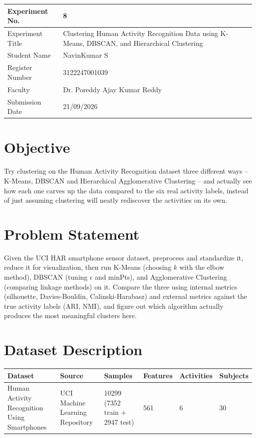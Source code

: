 \documentclass[12pt,a4paper]{article}
\begin{document}
\begin{tabular}{|p{4cm}|p{11cm}|}
\hline
Experiment No. & 8 \\ \hline
Experiment Title & Clustering Human Activity Recognition Data using K-Means, DBSCAN, and Hierarchical
Clustering\footnotemark \\ \hline
Student Name & NavinKumar S \\ \hline
Register Number & 3122247001039 \\ \hline
Faculty & Dr. Poreddy Ajay Kumar Reddy \\ \hline
Submission Date & 21/09/2026 \\ \hline
\end{tabular}

\section{Objective}
Try clustering on the Human Activity Recognition dataset three different ways -- K-Means, DBSCAN and
Hierarchical Agglomerative Clustering -- and actually see how each one carves up the data compared to
the six real activity labels, instead of just assuming clustering will neatly rediscover the activities
on its own.

\section{Problem Statement}
Given the UCI HAR smartphone sensor dataset, preprocess and standardize it, reduce it for
visualization, then run K-Means (choosing $k$ with the elbow method), DBSCAN (tuning $\epsilon$ and
minPts), and Agglomerative Clustering (comparing linkage methods) on it. Compare the three using
internal metrics (silhouette, Davies-Bouldin, Calinski-Harabasz) and external metrics against the true
activity labels (ARI, NMI), and figure out which algorithm actually produces the most meaningful
clusters here.

\section{Dataset Description}
\begin{longtable}{|p{3.5cm}|p{4cm}|p{1.6cm}|p{1.8cm}|p{2cm}|p{2.2cm}|}
\hline
\textbf{Dataset} & \textbf{Source} & \textbf{Samples} & \textbf{Features} & \textbf{Activities} & \textbf{Subjects} \\ \hline
Human Activity Recognition Using Smartphones & UCI Machine Learning Repository & 10299 (7352 train +
2947 test) & 561 & 6 & 30 \\ \hline
\end{longtable}
\end{document}
